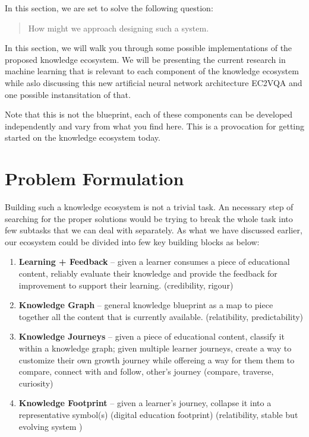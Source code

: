 \documentclass[]{book}
\theoremstyle{definition}
\theoremstyle{definition}
\theoremstyle{definition}
\theoremstyle{remark}
\begin{document}
In this section, we are set to solve the following question:

\begin{quote}
How might we approach designing such a system.
\end{quote}

In this section, we will walk you through some possible implementations
of the proposed knowledge ecosystem. We will be presenting the current
research in machine learning that is relevant to each component of the
knowledge ecosystem while aslo discussing this new artificial neural
network architecture EC2VQA and one possible instansitation of that.

Note that this is not the blueprint, each of these components can be
developed independently and vary from what you find here. This is a
provocation for getting started on the knowledge ecosystem today.

\section{Problem Formulation}\label{problem-formulation}

Building such a knowledge ecosystem is not a trivial task. An necessary
step of searching for the proper solutions would be trying to break the
whole task into few subtasks that we can deal with separately. As what
we have discussed earlier, our ecosystem could be divided into few key
building blocks as below:

\begin{enumerate}
\def\labelenumi{\arabic{enumi}.}
\item
  \textbf{Learning + Feedback} -- given a learner consumes a piece of
  educational content, reliably evaluate their knowledge and provide the
  feedback for improvement to support their learning. (credibility,
  rigour)
\item
  \textbf{Knowledge Graph} -- general knowledge blueprint as a map to
  piece together all the content that is currently available.
  (relatibility, predictability)
\item
  \textbf{Knowledge Journeys} -- given a piece of educational content,
  classify it within a knowledge graph; given multiple learner journeys,
  create a way to customize their own growth journey while offereing a
  way for them them to compare, connect with and follow, other's journey
  (compare, traverse, curiosity)
\item
  \textbf{Knowledge Footprint} -- given a learner's journey, collapse it
  into a representative symbol(s) (digital education footprint)
  (relatibility, stable but evolving system )
\end{enumerate}
\end{document}
